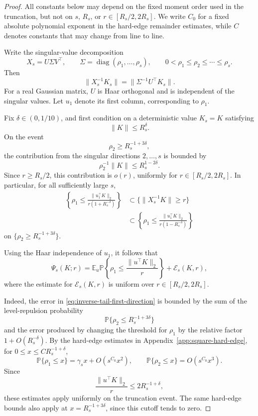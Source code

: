 \documentclass[11pt]{article}
\DeclareMathOperator{\diag}{diag}
\newcommand{\Pbb}{\mathbb P}
\newcommand{\Ebb}{\mathbb E}
\newcommand{\1}{\mathbf 1}
\begin{document}
\begin{proof}
All constants below may depend on the fixed moment order used in the
truncation, but not on \(s\), \(R_s\), or
\(r\in[R_s/2,2R_s]\). We write \(C_0\) for a fixed absolute
polynomial exponent in the hard-edge remainder estimates, while \(C\)
denotes constants that may change from line to line.

Write the singular-value decomposition
\[
        X_s=U\Sigma V^\top,
        \qquad
        \Sigma=\diag(\rho_1,\ldots,\rho_s),
        \qquad
        0<\rho_1\le\rho_2\le\cdots\le\rho_s.
\]
Then
\[
        \|X_s^{-1}K_s\|
        =
        \|\Sigma^{-1}U^\top K_s\|.
\]
For a real Gaussian matrix, \(U\) is Haar orthogonal and is independent
of the singular values. Let \(u_1\) denote its first column,
corresponding to \(\rho_1\).

Fix \(\delta\in(0,1/10)\), and first condition on a deterministic value
\(K_s=K\) satisfying
\[
        \|K\|\le R_s^\delta.
\]
On the event
\[
        \rho_2\ge R_s^{-1+3\delta},
\]
the contribution from the singular directions \(2,\ldots,s\) is
bounded by
\[
        \rho_2^{-1}\|K\|
        \le R_s^{1-2\delta}.
\]
Since \(r\ge R_s/2\), this contribution is \(o(r)\), uniformly for
\(r\in[R_s/2,2R_s]\). In particular, for all sufficiently large \(s\),
\begin{align*}
        \left\{
        \rho_1
        \le
        \frac{\|u_1^\top K\|_2}
        {r(1+R_s^{-\delta})}
        \right\}
        &\subset
        \{\|X_s^{-1}K\|\ge r\}
\\
        &\subset
        \left\{
        \rho_1
        \le
        \frac{\|u_1^\top K\|_2}
        {r(1-R_s^{-\delta})}
        \right\}
\end{align*}
on \(\{\rho_2\ge R_s^{-1+3\delta}\}\).

Using the Haar independence of \(u_1\), it follows that
\begin{equation}
        \Psi_s(K;r)
        =
        \Ebb_u
        \Pbb\left\{
        \rho_1
        \le
        \frac{\|u^\top K\|_2}{r}
        \right\}
        +
        \mathcal E_s(K,r),
        \label{eq:inverse-tail-first-direction}
\end{equation}
where the estimate for \(\mathcal E_s(K,r)\) is uniform over
\(r\in[R_s/2,2R_s]\).

Indeed, the error in \eqref{eq:inverse-tail-first-direction} is bounded
by the sum of the level-repulsion probability
\[
        \Pbb\{\rho_2\le R_s^{-1+3\delta}\}
\]
and the error produced by changing the threshold for \(\rho_1\) by the
relative factor \(1+O(R_s^{-\delta})\). By the hard-edge estimates in
Appendix~\ref{app:square-hard-edge}, for
\(0\le x\le C R_s^{-1+\delta}\),
\[
        \Pbb\{\rho_1\le x\}
        =
        \gamma_s x+O(s^{C_0}x^2),
        \qquad
        \Pbb\{\rho_2\le x\}
        =
        O(s^{C_0}x^3).
\]
Since
\[
        \frac{\|u^\top K\|_2}{r}
        \le
        2R_s^{-1+\delta},
\]
these estimates apply uniformly on the truncation event. The same hard-edge
bounds also apply at \(x=R_s^{-1+3\delta}\), since this cutoff tends to zero.


\end{proof}
\end{document}
